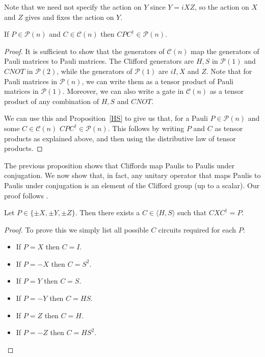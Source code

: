\documentclass[12pt]{dalthesis}
\begin{document}
Note that we need not specify the action on $Y$ since $Y = iXZ$, so the action on $X$ and $Z$ gives and fixes the action on $Y$.

\begin{proposition}
\label{CliffordPtoP}
If $P \in \mathcal{P}(n)$ and $C \in \mathcal{C}(n)$ then $CPC^{\dag} \in \mathcal{P}(n)$.
\end{proposition}
\begin{proof}
It is sufficient to show that the generators of $\mathcal{C}(n)$ map the generators of Pauli matrices to Pauli matrices. The Clifford generators are $H, S$ in $\mathcal{P}(1)$ and $CNOT$ in $\mathcal{P}(2)$, while the generators of $\mathcal{P}(1)$ are $iI, X$ and $Z$. Note that for Pauli matrices in $\mathcal{P}(n)$, we can write them as a tensor product of Pauli matrices in $\mathcal{P}(1)$. Moreover, we can also write a gate in $\mathcal{C}(n)$ as a tensor product of any combination of $H, S$ and $CNOT$. 

We can use this and Proposition~\ref{HS} to give us that, for a Pauli $P \in \mathcal{P}(n)$ and some $C \in \mathcal{C}(n)$ $CPC^\dagger \in \mathcal{P}(n)$. This follows by writing $P$ and $C$ as tensor products as explained above, and then using the distributive law of tensor products.
\end{proof}

The previous proposition shows that Cliffords map Paulis to Paulis under conjugation. We now show that, in fact, any unitary operator that maps Paulis to Paulis under conjugation is an element of the Clifford group (up to a scalar). Our proof follows \cite{nielsen00}.

\begin{lemma}
\label{ConjX}
Let $P \in \{\pm X, \pm Y, \pm Z \}$. Then there exists a $C \in \langle H, S \rangle$ such that $CXC^\dag = P$.
\end{lemma}
\begin{proof}
To prove this we simply list all possible $C$ circuits required for each $P$:
\begin{itemize}
\item If $P = X$ then $C = I$.
\item If $P = -X$ then $C = S^2$.
\item If $P = Y$ then $C = S$.
\item If $P = -Y$ then $C = HS$.
\item If $P = Z$ then $C = H$.
\item If $P = -Z$ then $C = HS^2$.
\end{itemize}
\end{proof}
\end{document}

